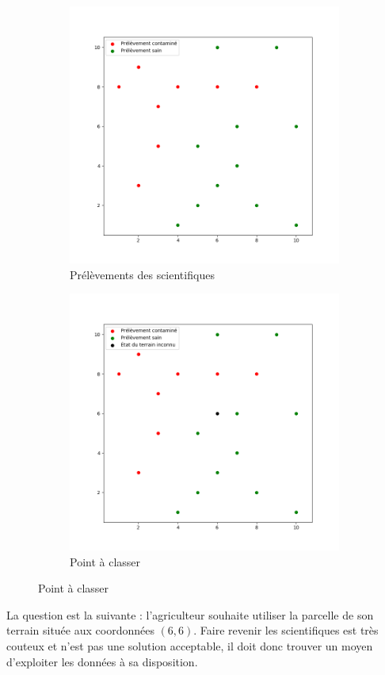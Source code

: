 \documentclass[12pt]{article}                   %
\theoremstyle{exercicestyle}
\theoremstyle{break2}
\theoremstyle{break3}
\begin{document}
\begin{figure}[!h]
    \begin{subfigure}[b]{0.5\textwidth}
\begin{center}
\includegraphics[width=9cm]{Figure_1.png}
\caption{Prélèvements des scientifiques}
\end{center}
    \end{subfigure}
    \begin{subfigure}[b]{0.5\textwidth}
\begin{center}
\includegraphics[width=9cm]{Figure_2.png}
\caption{Point à classer}
\label{fig:aclasser}
\end{center}
    \end{subfigure}
\end{figure}

La question est la suivante : l'agriculteur souhaite utiliser la parcelle de son terrain située aux coordonnées $(6, 6)$. Faire revenir les scientifiques est très couteux et n'est pas une solution acceptable, il doit donc trouver un moyen d'exploiter les données à sa disposition.
\end{document}
